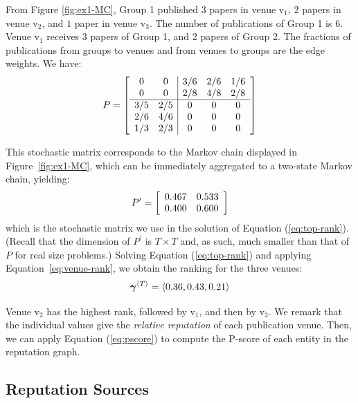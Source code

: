 \documentclass[notitlepage]{svjour3}
\begin{document}
From Figure \ref{fig:ex1-MC}, Group 1 published $3$ papers in venue $\mbox{v}_1$, $2$ papers in venue $\mbox{v}_2$, and $1$ paper in venue $\mbox{v}_3$. The number of publications of Group 1 is $6$. Venue $\mbox{v}_1$ receives $3$ papers of Group 1, and 2 papers of Group 2. The fractions of publications from groups to venues and from venues to groups are the edge weights. We have:
\[
P =
\left[
\begin{array}{c c | c c c }
0            &0             &3/6       &2/6         &1/6    \\
0            &0             &2/8       &4/8         &2/8    \\
\hline
3/5          &2/5           &0         &0           &0       \\
2/6          &4/6           &0         &0           &0       \\
1/3          &2/3           &0         &0           &0       \\
\end{array}
\right]
\]

This stochastic matrix corresponds to the Markov chain displayed in Figure~\ref{fig:ex1-MC}, which can be immediately aggregated to a two-state Markov chain, yielding:
%
\[
P^\prime = 
\left[
\begin{array}{c c }
0.467   &0.533 \\
0.400   &0.600
\end{array}
\right]
\]
\noindent which is the stochastic matrix we use in the solution of Equation (\ref{eq:top-rank}). (Recall that the dimension of $P^\prime$ is $T \times T$ and, as such, much smaller than that of $P$ for real size problems.) Solving Equation (\ref{eq:top-rank}) and applying Equation~\eqref{eq:venue-rank}, we obtain the ranking for the three venues: 
\begin{equation}
{\mbox{\boldmath $\gamma$}}{^{\langle T \rangle}} = \langle 0.36, 0.43, 0.21 \rangle
\end{equation}

Venue $\mbox{v}_2$ has the highest rank, followed by $\mbox{v}_1$, and then by $\mbox{v}_3$. We remark that the individual values give the {\em relative reputation} of each publication venue. 
%
Then, we can apply Equation (\ref{eq:pscore}) to compute the P-score of each entity in the reputation graph.


\subsection{Reputation Sources}
\label{sec:rep-sources}
\end{document}
